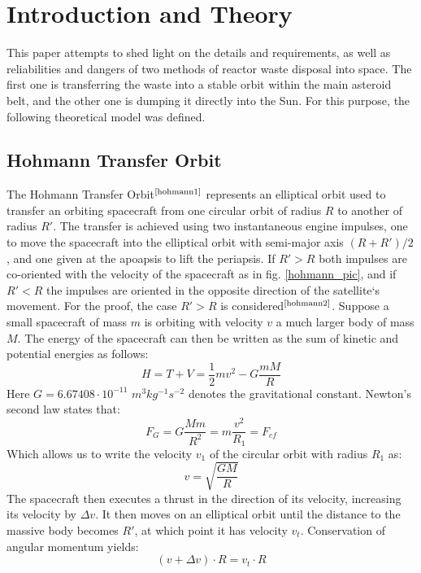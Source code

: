 \documentclass[onecolumn,12pt]{article}
\numberwithin{equation}{section}
\begin{document}
\section{Introduction and Theory}

This paper attempts to shed light on the details and requirements, as well as reliabilities and dangers of two methods of reactor waste disposal into space. The first one is transferring the waste into a stable orbit within the main asteroid belt, and the other one is dumping it directly into the Sun. For this purpose, the following theoretical model was defined.

\subsection{Hohmann Transfer Orbit}
 The Hohmann Transfer Orbit$^{\text{\cite{hohmann1}}}$ represents an elliptical orbit used to transfer an orbiting spacecraft from one circular orbit of radius $R$ to another of radius $R'$. The transfer is achieved using two instantaneous engine impulses, one to move the spacecraft into the elliptical orbit with semi-major axis $(R+R')/2$, and one given at the apoapsis to lift the periapsis. If $R'>R$ both impulses are co-oriented with the velocity of the spacecraft as in fig. \ref{hohmann_pic}, and if $R'<R$ the impulses are oriented in the opposite direction of the satellite`s movement. For the proof, the case $R'>R$ is considered$^{\text{\cite{hohmann2}}}$. Suppose a small spacecraft of mass $m$ is orbiting with velocity $v$ a much larger body of mass $M$. The energy of the spacecraft can then be written as the sum of kinetic and potential energies as follows:
\begin{equation}
    H= T + V = \frac{1}{2}mv^2 - G \frac{mM}{R}
\end{equation}
Here $G= 6.67408 \cdot 10^{-11}$ $m^3 kg^{-1} s^{-2}$ denotes the gravitational constant. Newton's second law states that:
\begin{equation}
    F_G=G\frac{Mm}{R^2} = m \frac{v^2}{R_1}= F_{cf}
\end{equation}
Which allows us to write the velocity $v_1$ of the circular orbit with radius $R_1$ as:
\begin{equation}
    v = \sqrt{\frac{GM}{R}}
    \label{v1}
\end{equation}
The spacecraft then executes a thrust in the direction of its velocity, increasing its velocity by $\Delta v$. It then moves on an elliptical orbit until the distance to the massive body becomes $R'$, at which point it has velocity $v_t$. Conservation of angular momentum yields:
\begin{equation}
      (v + \Delta v)\cdot R = v_t\cdot R
      \label{mc}
\end{equation}
\end{document}
